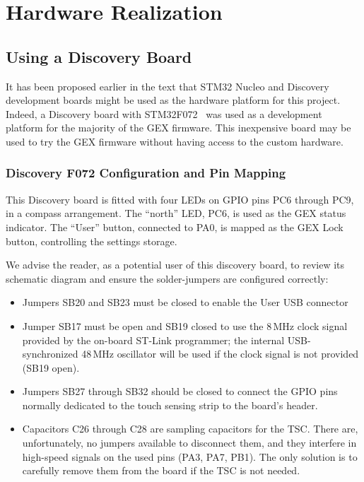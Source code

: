 \chapter{Hardware Realization} \label{sec:hwreal}

\section{Using a Discovery Board}

It has been proposed earlier in the text that STM32 Nucleo and Discovery development boards might be used as the hardware platform for this project. Indeed, a Discovery board with STM32F072~\cite{disco-f072} was used as a development platform for the majority of the GEX firmware. This inexpensive board may be used to try the GEX firmware without having access to the custom hardware.

\subsection{Discovery F072 Configuration and Pin Mapping}

This Discovery board is fitted with four \glspl{LED} on \gls{GPIO} pins PC6 through PC9, in a compass arrangement. The ``north'' \gls{LED}, PC6, is used as the GEX status indicator. The ``User'' button, connected to PA0, is mapped as the GEX Lock button, controlling the settings storage.

We advise the reader, as a potential user of this discovery board, to review its schematic diagram and ensure the solder-jumpers are configured correctly:

\begin{itemize}
	\item Jumpers SB20 and SB23 must be closed to enable the User \gls{USB} connector
	
	\item Jumper SB17 must be open and SB19 closed to use the 8\,MHz clock signal provided by the on-board ST-Link programmer; the internal USB-synchronized 48\,MHz oscillator will be used if the clock signal is not provided (SB19 open).
	
	\item Jumpers SB27 through SB32 should be closed to connect the \gls{GPIO} pins normally dedicated to the touch sensing strip to the board's header. 
	
	\item Capacitors C26 through C28 are sampling capacitors for the \gls{TSC}. There are, unfortunately, no jumpers available to disconnect them, and they interfere in high-speed signals on the used pins (PA3, PA7, PB1). The only solution is to carefully remove them from the board if the \gls{TSC} is not needed.
\end{itemize} 

